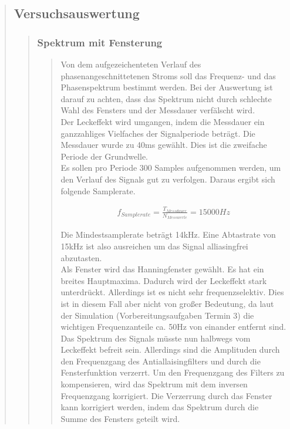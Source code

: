 \begin{quote}
\begin{quote}
\begin{quote}
		\end{quote}%
	\end{quote}%
	
	\subsection{Versuchsauswertung}
    \begin{quote}
        \subsubsection{Spektrum mit Fensterung}
		\begin{quote}
            Von dem aufgezeichenteten Verlauf des phasenangeschnittetenen Stroms soll das Frequenz- und das
            Phasenspektrum bestimmt werden. Bei der Auswertung ist darauf zu achten, dass das Spektrum nicht durch
            schlechte Wahl des Fensters und der
            Messdauer verfälscht wird.\\
            Der Leckeffekt wird umgangen, indem die Messdauer ein ganzzahliges Vielfaches der Signalperiode beträgt. Die
            Messdauer wurde zu 40ms gewählt. Dies ist die zweifache Periode der Grundwelle.\\
            Es sollen pro Periode 300 Samples aufgenommen werden, um den Verlauf des Signals gut zu verfolgen.
            Daraus ergibt sich folgende Samplerate.
            
            \begin{align}
              f_{Samplerate} = \frac{T_{Messdauer}}{N_{Messwerte}} = 15000Hz
            \end{align} 
            
            Die Mindestsamplerate beträgt 14kHz. Eine Abtastrate von 15kHz ist also ausreichen um das Signal
            alliasingfrei abzutasten.\\
            Als Fenster wird das Hanningfenster gewählt. Es hat ein breites Hauptmaxima. Dadurch wird der Leckeffekt
            stark unterdrückt. Allerdings ist es nicht sehr frequenzselektiv. Dies ist in diesem Fall aber nicht von
            großer Bedeutung, da laut der Simulation (Vorbereitungsaufgaben Termin 3) die wichtigen Frequenzanteile ca.
            50Hz von einander entfernt sind.\\
            Das Spektrum des Signals müsste nun halbwegs vom Leckeffekt befreit sein.
            Allerdings sind die Amplituden durch den Frequenzgang des Antiallaisingfilters und durch die Fensterfunktion
            verzerrt. Um den Frequenzgang des Filters zu kompensieren, wird das Spektrum mit dem inversen Frequenzgang
            korrigiert. Die Verzerrung durch das Fenster kann korrigiert werden, indem das Spektrum durch die Summe des
            Fensters geteilt wird.\\
            

\end{quote}
\end{quote}
\end{quote}

